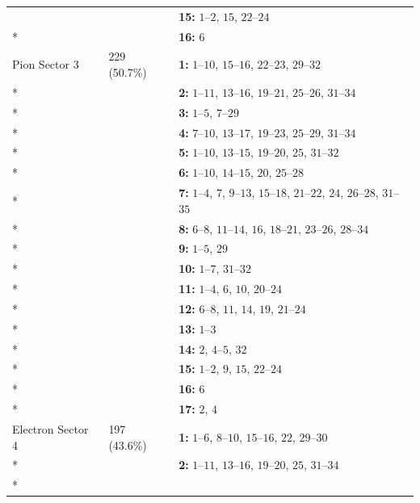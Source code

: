 \begin{longtable}{p{3.5cm}p{2.2cm}p{8.3cm}}
 &  & \textbf{15:} \mbox{$1$--$2$}, \mbox{$15$}, \mbox{$22$--$24$} \\*
 &  & \textbf{16:} \mbox{$6$} \\
\addlinespace
Pion Sector 3 & 229 (50.7\%) & \textbf{1:} \mbox{$1$--$10$}, \mbox{$15$--$16$}, \mbox{$22$--$23$}, \mbox{$29$--$32$} \\*
 &  & \textbf{2:} \mbox{$1$--$11$}, \mbox{$13$--$16$}, \mbox{$19$--$21$}, \mbox{$25$--$26$}, \mbox{$31$--$34$} \\*
 &  & \textbf{3:} \mbox{$1$--$5$}, \mbox{$7$--$29$} \\*
 &  & \textbf{4:} \mbox{$7$--$10$}, \mbox{$13$--$17$}, \mbox{$19$--$23$}, \mbox{$25$--$29$}, \mbox{$31$--$34$} \\*
 &  & \textbf{5:} \mbox{$1$--$10$}, \mbox{$13$--$15$}, \mbox{$19$--$20$}, \mbox{$25$}, \mbox{$31$--$32$} \\*
 &  & \textbf{6:} \mbox{$1$--$10$}, \mbox{$14$--$15$}, \mbox{$20$}, \mbox{$25$--$28$} \\*
 &  & \textbf{7:} \mbox{$1$--$4$}, \mbox{$7$}, \mbox{$9$--$13$}, \mbox{$15$--$18$}, \mbox{$21$--$22$}, \mbox{$24$}, \mbox{$26$--$28$}, \mbox{$31$--$35$} \\*
 &  & \textbf{8:} \mbox{$6$--$8$}, \mbox{$11$--$14$}, \mbox{$16$}, \mbox{$18$--$21$}, \mbox{$23$--$26$}, \mbox{$28$--$34$} \\*
 &  & \textbf{9:} \mbox{$1$--$5$}, \mbox{$29$} \\*
 &  & \textbf{10:} \mbox{$1$--$7$}, \mbox{$31$--$32$} \\*
 &  & \textbf{11:} \mbox{$1$--$4$}, \mbox{$6$}, \mbox{$10$}, \mbox{$20$--$24$} \\*
 &  & \textbf{12:} \mbox{$6$--$8$}, \mbox{$11$}, \mbox{$14$}, \mbox{$19$}, \mbox{$21$--$24$} \\*
 &  & \textbf{13:} \mbox{$1$--$3$} \\*
 &  & \textbf{14:} \mbox{$2$}, \mbox{$4$--$5$}, \mbox{$32$} \\*
 &  & \textbf{15:} \mbox{$1$--$2$}, \mbox{$9$}, \mbox{$15$}, \mbox{$22$--$24$} \\*
 &  & \textbf{16:} \mbox{$6$} \\*
 &  & \textbf{17:} \mbox{$2$}, \mbox{$4$} \\
\addlinespace
Electron Sector 4 & 197 (43.6\%) & \textbf{1:} \mbox{$1$--$6$}, \mbox{$8$--$10$}, \mbox{$15$--$16$}, \mbox{$22$}, \mbox{$29$--$30$} \\*
 &  & \textbf{2:} \mbox{$1$--$11$}, \mbox{$13$--$16$}, \mbox{$19$--$20$}, \mbox{$25$}, \mbox{$31$--$34$} \\*

\end{longtable}
